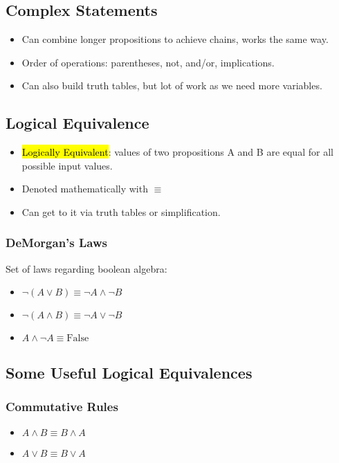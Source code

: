 \subsection{Complex Statements}
\begin{itemize}
    \item Can combine longer propositions to achieve chains, works the same way. 
    \item Order of operations: parentheses, not, and/or, implications.
    \item Can also build truth tables, but lot of work as we need more variables.
\end{itemize}

\subsection{Logical Equivalence}
\begin{itemize}
    \item \hl{Logically Equivalent}: values of two propositions A and B are equal for all possible input values.
    \item Denoted mathematically with $\equiv$
    \item Can get to it via truth tables or simplification.
\end{itemize}

\subsubsection{DeMorgan's Laws}
Set of laws regarding boolean algebra:
\begin{itemize}
    \item $\neg(A \lor B) \equiv \neg A \land \neg B$
    \item $\neg(A \land B) \equiv \neg A \lor \neg B$
    \item $A \land \neg A \equiv \text{False}$
\end{itemize}

\subsection{Some Useful Logical Equivalences}

\subsubsection{Commutative Rules}
\begin{itemize}
    \item $A \land B \equiv B \land A$
    \item $A \lor B \equiv B \lor A$
\end{itemize}


